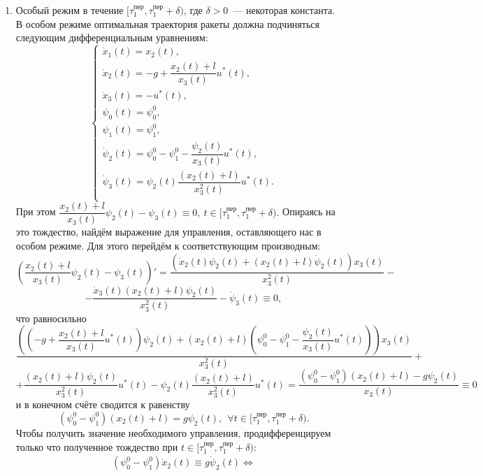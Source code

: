 \documentclass[a4paper,12pt]{article}
\begin{document}
\begin{itemize}
\begin{enumerate}
	\begin{enumerate}
		\item Особый режим в течение $[\tau_1^{\text{пер}}, \tau_1^{\text{пер}} + \delta)$, где $\delta > 0$~--- некоторая константа. \\
		В особом режиме оптимальная траектория ракеты должна подчиняться следующим дифференциальным уравнениям:
$$\begin{cases}
	\dot{x}_1(t) = x_2(t), \\
	\dot{x}_2(t) = -g + \dfrac{x_2(t) + l}{x_3(t)}u^*(t), \\
	\dot{x}_3(t) = -u^*(t), \\
	\psi_0(t) = \psi_0^0, \\ 
	\psi_1(t) = \psi_1^0, \\
	\dot{\psi}_2(t) = \psi_{0}^0 - \psi_{1}^0 - \dfrac{\psi_{2}(t)}{x_{3}(t)}u^*(t), \\
	\dot{\psi}_3(t) = \psi_2(t) \dfrac{(x_2(t) + l)}{x_3^2(t)} u^*(t). \\ 
\end{cases} $$
При этом $ \dfrac{x_2(t) + l}{x_3(t)}\psi_2(t) - \psi_3(t) \equiv 0, \ t \in [\tau_1^{\text{пер}}, \tau_1^{\text{пер}} + \delta).$ 
Опираясь на это тождество, найдём выражение для управления, оставляющего нас в особом режиме. Для этого перейдём к соответствующим производным:
\[ \left(\dfrac{x_2(t) + l}{x_3(t)}\psi_2(t) - \psi_3(t) \right)' = \dfrac{\left(\dot{x}_2(t)\psi_2(t) + (x_2(t) + l)\dot{\psi}_2(t) \right) x_3(
t)}{x_3^2(t)} - \] 
\[ - \dfrac{\dot{x}_3(t)(x_2(t) + l)\psi_2(t)}{x_3^2(t)} - \dot{\psi}_3(t) \equiv 0, \]
что равносильно
\[\dfrac{\left( \left(-g + \dfrac{x_2(t) + l}{x_3(t)}u^*(t) \right)\psi_2(t) + \left(x_2(t) + l\right)\left(\psi_{0}^0 - \psi_{1}^0 - \dfrac{\psi_{2}(t)}{x_{3}(t)}u^*(t) \right) \right) x_3(t)}{x_3^2(t)} + \]
\[ + \dfrac{(x_2(t) + l)\psi_2(t)}{x_3^2(t)}u^*(t) - \psi_2(t) \dfrac{(x_2(t) + l)}{x_3^2(t)} u^*(t) = \dfrac{\left(\psi_{0}^0 - \psi_{1}^0\right)(x_2(t) + l) - g\psi_2(t)}{x_3(t)} \equiv 0 \]
и в конечном счёте сводится к равенству
\hypertarget{p8}{}
\begin{equation} \label{eq8}
\left(\psi_{0}^0 - \psi_{1}^0\right)(x_2(t) + l) = g\psi_2(t),  \ \ \forall t \in [\tau_1^{\text{пер}}, \tau_1^{\text{пер}} + \delta). 
\end{equation}
Чтобы получить значение необходимого управления, продифференцируем только что полученное тождество при $t \in [\tau_1^{\text{пер}}, \tau_1^{\text{пер}} + \delta)$: 
\begin{multline*}
\left(\psi_{0}^0 - \psi_{1}^0\right)\dot{x}_2(t) \equiv g\dot{\psi}_2(t) \Leftrightarrow \\

\end{multline*}
\end{enumerate}
\end{enumerate}
\end{itemize}
\end{document}
